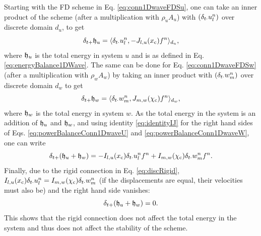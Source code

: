 Starting with the FD scheme in Eq. \eqref{eq:conn1DwaveFDSu}, one can take an inner product of the scheme (after a multiplication with $\rho_u A_u$) with $(\delta_{t\cdot}u_l^n)$ over discrete domain $d_u$, to get
\begin{equation}\label{eq:powerBalanceConn1DwaveU}
    \delta_{t+} \mathfrak{h}_u = \langle \delta_{t\cdot}u_l^n, -J_{l, u}(x_{\text{c}}) f^n\rangle_{d_u},
\end{equation}
where $\mathfrak{h}_u$ is the total energy in system $u$ and is as defined in Eq. \eqref{eq:energyBalance1DWave}. The same can be done for Eq. \eqref{eq:conn1DwaveFDSw} (after a multiplication with $\rho_w A_w$) by taking an inner product with $(\delta_{t\cdot}w_m^n)$ over discrete domain $d_w$ to get 
\begin{equation}\label{eq:powerBalanceConn1DwaveW}
    \delta_{t+} \mathfrak{h}_w = \langle \delta_{t\cdot}w_m^n, J_{m, w}(\chi_{\text{c}}) f^n\rangle_{d_w},
\end{equation}
where $\mathfrak{h}_w$ is the total energy in system $w$. As the total energy in the system is an addition of $\mathfrak{h}_u$ and $\mathfrak{h}_w$, and using identity \eqref{eq:identityIJ} for the right hand sides of Eqs. \eqref{eq:powerBalanceConn1DwaveU} and \eqref{eq:powerBalanceConn1DwaveW}, one can write 
\begin{equation}\label{eq:rOCconnSystem}
    \delta_{t+} (\mathfrak{h}_u + \mathfrak{h}_w) = -I_{l, u}(x_{\text{c}}) \delta_{t\cdot} u_l^n f^n + I_{m, w}(\chi_{\text{c}}) \delta_{t\cdot} w_m^n f^n.
\end{equation}
Finally, due to the rigid connection in Eq. \eqref{eq:discRigid}, $I_{l, u}(x_{\text{c}}) \delta_{t\cdot} u_l^n = I_{m, w}(\chi_{\text{c}}) \delta_{t\cdot} w_m^n$ (if the displacements are equal, their velocities must also be) and the right hand side vanishes:
\begin{equation*}
    \delta_{t+} (\mathfrak{h}_u + \mathfrak{h}_w) = 0.
\end{equation*}
This shows that the rigid connection does not affect the total energy in the system and thus does not affect the stability of the scheme.

